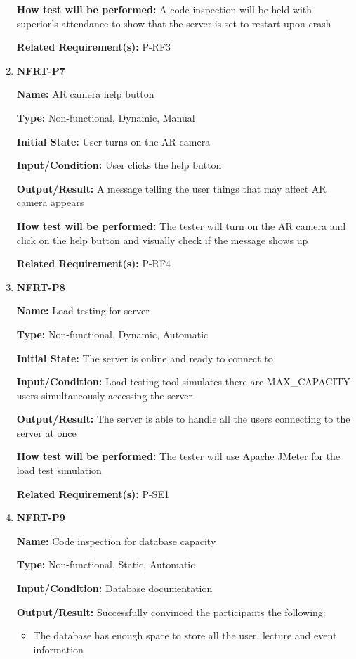 \documentclass[12pt, titlepage]{article}
\begin{document}
\begin{enumerate}
\textbf{How test will be performed:} A code inspection will be held with superior's attendance to show that the server is set to restart upon crash

\textbf{Related Requirement(s):} P-RF3

\item{\textbf{NFRT-P7}}

\textbf{Name:} AR camera help button

\textbf{Type:} Non-functional, Dynamic, Manual
					
\textbf{Initial State:} User turns on the AR camera

\textbf{Input/Condition:} User clicks the help button
					
\textbf{Output/Result:} A message telling the user things that may affect AR camera appears

\textbf{How test will be performed:} The tester will turn on the AR camera and click on the help button and visually check if the message shows up

\textbf{Related Requirement(s):} P-RF4

\item{\textbf{NFRT-P8}}

\textbf{Name:} Load testing for server

\textbf{Type:} Non-functional, Dynamic, Automatic
					
\textbf{Initial State:} The server is online and ready to connect to

\textbf{Input/Condition:} Load testing tool simulates there are MAX\_CAPACITY users simultaneously accessing the server

\textbf{Output/Result:} The server is able to handle all the users connecting to the server at once

\textbf{How test will be performed:} The tester will use Apache JMeter for the load test simulation

\textbf{Related Requirement(s):} P-SE1

\item{\textbf{NFRT-P9}}

\textbf{Name:} Code inspection for database capacity

\textbf{Type:} Non-functional, Static, Automatic

\textbf{Input/Condition:} Database documentation

\textbf{Output/Result:} Successfully convinced the participants the following:
\begin{itemize}
\item The database has enough space to store all the user, lecture and event information
\end{itemize}


\end{enumerate}
\end{document}
